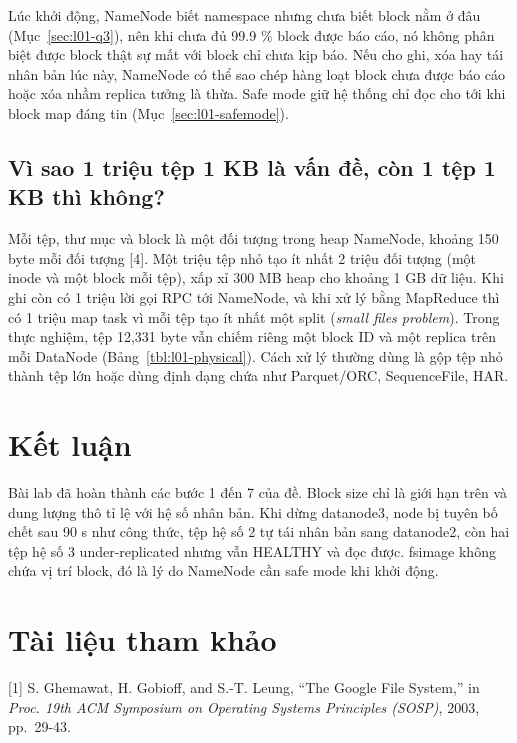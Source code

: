 \documentclass[
  12pt,
  a4paper,
]{article}
\begin{document}
Lúc khởi động, NameNode biết namespace nhưng chưa biết block nằm ở đâu
(Mục~\ref{sec:l01-q3}), nên khi chưa đủ 99.9 \% block được báo cáo, nó
không phân biệt được block thật sự mất với block chỉ chưa kịp báo. Nếu
cho ghi, xóa hay tái nhân bản lúc này, NameNode có thể sao chép hàng
loạt block chưa được báo cáo hoặc xóa nhầm replica tưởng là thừa. Safe
mode giữ hệ thống chỉ đọc cho tới khi block map đáng tin
(Mục~\ref{sec:l01-safemode}).

\subsection{Vì sao 1 triệu tệp 1 KB là vấn đề, còn 1 tệp 1 KB thì
không?}\label{sec:l01-q8}

Mỗi tệp, thư mục và block là một đối tượng trong heap NameNode, khoảng
150 byte mỗi đối tượng {[}4{]}. Một triệu tệp nhỏ tạo ít nhất 2 triệu
đối tượng (một inode và một block mỗi tệp), xấp xỉ 300 MB heap cho
khoảng 1 GB dữ liệu. Khi ghi còn có 1 triệu lời gọi RPC tới NameNode, và
khi xử lý bằng MapReduce thì có 1 triệu map task vì mỗi tệp tạo ít nhất
một split (\emph{small files problem}). Trong thực nghiệm, tệp 12,331
byte vẫn chiếm riêng một block ID và một replica trên mỗi DataNode
(Bảng~\ref{tbl:l01-physical}). Cách xử lý thường dùng là gộp tệp nhỏ
thành tệp lớn hoặc dùng định dạng chứa như Parquet/ORC, SequenceFile,
HAR.

\section{Kết luận}\label{sec:l01-conclusion}

Bài lab đã hoàn thành các bước 1 đến 7 của đề. Block size chỉ là giới
hạn trên và dung lượng thô tỉ lệ với hệ số nhân bản. Khi dừng datanode3,
node bị tuyên bố chết sau 90 s như công thức, tệp hệ số 2 tự tái nhân
bản sang datanode2, còn hai tệp hệ số 3 under-replicated nhưng vẫn
HEALTHY và đọc được. fsimage không chứa vị trí block, đó là lý do
NameNode cần safe mode khi khởi động.

\section*{Tài liệu tham khảo}\label{tuxe0i-liux1ec7u-tham-khux1ea3o}

{[}1{]} S. Ghemawat, H. Gobioff, and S.-T. Leung, ``The Google File
System,'' in \emph{Proc. 19th ACM Symposium on Operating Systems
Principles (SOSP)}, 2003, pp.~29-43.
\end{document}
